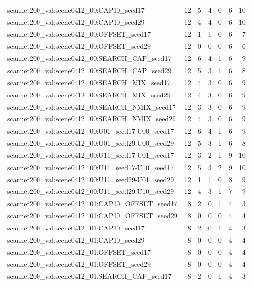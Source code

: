 \begin{table}[t]
\begin{tabular}{lrrrrrr}
scannet200\_val:scene0412\_00:CAP10\_seed17 & 12 & 5 & 4 & 0 & 6 & 10 \\
scannet200\_val:scene0412\_00:CAP10\_seed29 & 12 & 4 & 4 & 0 & 6 & 10 \\
scannet200\_val:scene0412\_00:OFFSET\_seed17 & 12 & 1 & 1 & 0 & 6 & 7 \\
scannet200\_val:scene0412\_00:OFFSET\_seed29 & 12 & 0 & 0 & 0 & 6 & 6 \\
scannet200\_val:scene0412\_00:SEARCH\_CAP\_seed17 & 12 & 6 & 4 & 1 & 6 & 9 \\
scannet200\_val:scene0412\_00:SEARCH\_CAP\_seed29 & 12 & 5 & 3 & 1 & 6 & 8 \\
scannet200\_val:scene0412\_00:SEARCH\_MIX\_seed17 & 12 & 4 & 3 & 0 & 6 & 9 \\
scannet200\_val:scene0412\_00:SEARCH\_MIX\_seed29 & 12 & 4 & 3 & 0 & 6 & 9 \\
scannet200\_val:scene0412\_00:SEARCH\_NMIX\_seed17 & 12 & 3 & 3 & 0 & 6 & 9 \\
scannet200\_val:scene0412\_00:SEARCH\_NMIX\_seed29 & 12 & 4 & 3 & 0 & 6 & 9 \\
scannet200\_val:scene0412\_00:U01\_seed17-U00\_seed17 & 12 & 6 & 4 & 1 & 6 & 9 \\
scannet200\_val:scene0412\_00:U01\_seed29-U00\_seed29 & 12 & 5 & 3 & 1 & 6 & 8 \\
scannet200\_val:scene0412\_00:U11\_seed17-U01\_seed17 & 12 & 3 & 2 & 1 & 9 & 10 \\
scannet200\_val:scene0412\_00:U11\_seed17-U10\_seed17 & 12 & 5 & 3 & 2 & 9 & 10 \\
scannet200\_val:scene0412\_00:U11\_seed29-U01\_seed29 & 12 & 1 & 1 & 0 & 8 & 9 \\
scannet200\_val:scene0412\_00:U11\_seed29-U10\_seed29 & 12 & 4 & 3 & 1 & 7 & 9 \\
scannet200\_val:scene0412\_01:CAP10\_OFFSET\_seed17 & 8 & 2 & 0 & 1 & 4 & 3 \\
scannet200\_val:scene0412\_01:CAP10\_OFFSET\_seed29 & 8 & 0 & 0 & 0 & 4 & 4 \\
scannet200\_val:scene0412\_01:CAP10\_seed17 & 8 & 2 & 0 & 1 & 4 & 3 \\
scannet200\_val:scene0412\_01:CAP10\_seed29 & 8 & 0 & 0 & 0 & 4 & 4 \\
scannet200\_val:scene0412\_01:OFFSET\_seed17 & 8 & 0 & 0 & 0 & 4 & 4 \\
scannet200\_val:scene0412\_01:OFFSET\_seed29 & 8 & 0 & 0 & 0 & 4 & 4 \\
scannet200\_val:scene0412\_01:SEARCH\_CAP\_seed17 & 8 & 2 & 0 & 1 & 4 & 3 \\

\end{tabular}
\end{table}
